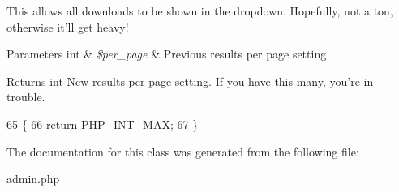 This allows all downloads to be shown in the dropdown. Hopefully, not a ton, otherwise it'll get heavy!


\begin{DoxyParams}[1]{Parameters}
int & {\em \$per\-\_\-page} & Previous results per page setting \\
\hline
\end{DoxyParams}
\begin{DoxyReturn}{Returns}
int New results per page setting. If you have this many, you're in trouble. 
\end{DoxyReturn}

\begin{DoxyCode}
65                                          \{
66         \textcolor{keywordflow}{return} PHP\_INT\_MAX;
67     \}
\end{DoxyCode}


The documentation for this class was generated from the following file\-:\begin{DoxyCompactItemize}
\item 
admin.\-php\end{DoxyCompactItemize}
